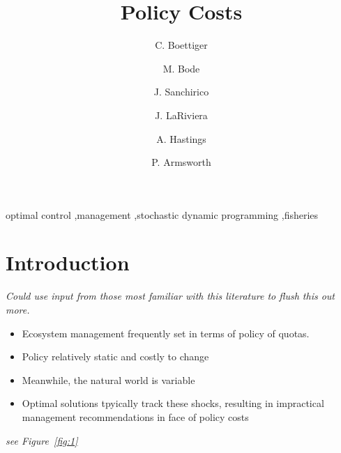 \documentclass[review, 12pt]{elsarticle}
\begin{document}
\begin{frontmatter}
\title{Policy Costs}
\author[cpb]{C. Boettiger}
\author[melbourne]{M. Bode}
\author[esp]{J. Sanchirico}
\author[utk-econ]{J. LaRiviera}
\author[cpb,esp]{A. Hastings}
\author[utk-eeb]{P. Armsworth}
\address[cpb]{Center for Population Biology, University of California, Davis, California 95616, USA}
\address[esp]{Department of Environmental Science \& Policy, University of California, Davis, CA 95616, USA}
\address[utk-econ]{Department of Economics, University of Tennessee, Knoxville, TN 37996, USA}
\address[utk-eeb]{Department of Ecology and Evolutionary Biology, University of Tennessee, Knoxville, TN 37996, USA}
\address[melbourne]{Australian Research Council Centre of Excellence for Environmental Decisions, University of Melbourne, School of Botany,
Parkville, Melbourne, VIC 3010, Australia}

\begin{abstract}
\end{abstract}
\begin{keyword}
  optimal control \sep management \sep stochastic dynamic programming \sep fisheries 
\end{keyword}

\end{frontmatter}

\section{Introduction}


\emph{Could use input from those most familiar with this literature to flush this out more.}

\begin{itemize}
  \item Ecosystem management frequently set in terms of policy of quotas. 
  \item Policy relatively static and costly to change
  \item Meanwhile, the natural world is variable
  \item Optimal solutions tpyically track these shocks, resulting in impractical management recommendations in face of policy costs
\end{itemize}

\emph{see Figure~\ref{fig:1}}
\end{document}
